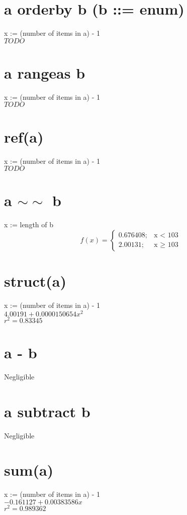 \documentclass[12pt]{article}
\begin{document}
	\section{a orderby b (b ::= enum)}
	x := (number of items in a) - 1\\
	$TODO$
	
	\section{a rangeas b}
	x := (number of items in a) - 1\\
	$TODO$
	
	\section{ref(a)}
	x := (number of items in a) - 1\\
	$TODO$
	
	\section{a $\sim\sim$ b}
	x := length of b
	\begin{displaymath}
		f(x) = \left\{
			\begin{array}{lr}
				0.676408; & \text{x $<$ 103}\\
				2.00131; & \text{x $\geq$ 103}
			\end{array}
		\right.
	\end{displaymath}
	
	\section{struct(a)}
	x := (number of items in a) - 1\\
	$4.00191 + 0.0000150654 x^2$\\
	$r^2 = 0.83345$
	
	\section{a - b}
	Negligible
	
	\section{a subtract b}
	Negligible
	
	\section{sum(a)}
	x := (number of items in a) - 1\\
	$-0.161127 + 0.00383586 x$\\
	$r^2 = 0.989362$
	
\end{document}
